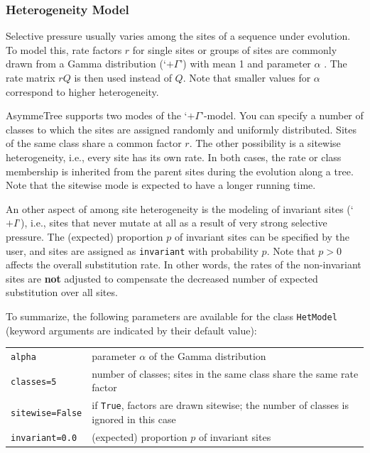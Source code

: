 \documentclass[hidelinks,11pt]{article}
\newcommand{\sq}{\textquotesingle}
\begin{document}
\subsubsection{Heterogeneity Model}

Selective pressure usually varies among the sites of a sequence under evolution.
To model this, rate factors $r$ for single sites or groups of sites are commonly drawn from a Gamma distribution (`$+\Gamma$') with mean 1 and parameter $\alpha$ \citep{cartwright2005,fletcher2009,dalquen2012}.
The rate matrix $rQ$ is then used instead of $Q$.
Note that smaller values for $\alpha$ correspond to higher heterogeneity.

AsymmeTree supports two modes of the `$+\Gamma$'-model.
You can specify a number of classes to which the sites are assigned randomly and uniformly distributed.
Sites of the same class share a common factor $r$.
The other possibility is a sitewise heterogeneity, i.e., every site has its own rate.
In both cases, the rate or class membership is inherited from the parent sites during the evolution along a tree.
Note that the sitewise mode is expected to have a longer running time.

An other aspect of among site heterogeneity is the modeling of invariant sites (`$+I$'), i.e., sites that never mutate at all as a result of very strong selective pressure.
The (expected) proportion $p$ of invariant sites can be specified by the user,
and sites are assigned as \texttt{\sq invariant\sq} with probability $p$.
Note that $p>0$ affects the overall substitution rate.
In other words, the rates of the non-invariant sites are \textbf{not} adjusted to compensate the decreased number of expected substitution over all sites.

To summarize, the following parameters are available for the class \texttt{HetModel} (keyword arguments are indicated by their default value):

\vspace{3mm}
{\small\centering
\begin{longtable}{ p{4.5cm} p{9cm} }
	\texttt{alpha} & parameter $\alpha$ of the Gamma distribution\\
	\texttt{classes=5} & number of classes; sites in the same class share the same rate factor\\
	\texttt{sitewise=False} & if \texttt{True}, factors are drawn sitewise; the number of classes is ignored in this case\\
	\texttt{invariant=0.0} & (expected) proportion $p$ of invariant sites\\
\end{longtable}
}
\vspace{3mm}
\end{document}

